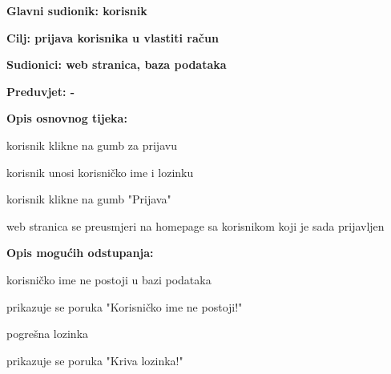 				
					\noindent {}
					\begin{packed_item}
						\item \textbf{Glavni sudionik: korisnik}
						\item  \textbf{Cilj: prijava korisnika u vlastiti račun}
						\item  \textbf{Sudionici: web stranica, baza podataka}
						\item  \textbf{Preduvjet: -}
						
						\item  \textbf{Opis osnovnog tijeka:}
						\item[] \begin{packed_enum}
							\item korisnik klikne na gumb za prijavu
							\item korisnik unosi korisničko ime i lozinku
							\item korisnik klikne na gumb "Prijava"
							\item web stranica se preusmjeri na homepage sa korisnikom koji je sada prijavljen
						\end{packed_enum}
						
						\item  \textbf{Opis mogućih odstupanja:}
						\item[] \begin{packed_item}
							\item[2.a] korisničko ime ne postoji u bazi podataka
							\begin{packed_enum}
								\item prikazuje se poruka "Korisničko ime ne postoji!"
							\end{packed_enum}
							\item[2.b] pogrešna lozinka
							\begin{packed_enum}
								\item prikazuje se poruka "Kriva lozinka!"
							\end{packed_enum}
						\end{packed_item}
					\end{packed_item}


